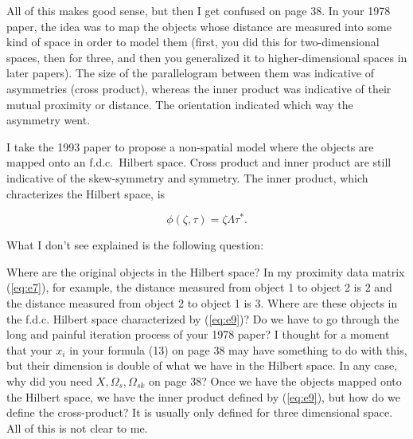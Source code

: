 \documentclass[landscape,10pt]{article}
\begin{document}
All of this makes good sense, but then I get confused on page 38. In
your 1978 paper, the idea was to map the objects whose distance are
measured into some kind of space in order to model them (first, you
did this for two-dimensional spaces, then for three, and then you
generalized it to higher-dimensional spaces in later papers). The size
of the parallelogram between them was indicative of asymmetries (cross
product), whereas the inner product was indicative of their mutual
proximity or distance. The orientation indicated which way the
asymmetry went.

I take the 1993 paper to propose a non-spatial model where the objects
are mapped onto an f.d.c.\ Hilbert space. Cross product and inner
product are still indicative of the skew-symmetry and symmetry. The
inner product, which chracterizes the Hilbert space, is

\begin{equation}
  \label{eq:e9}
  \phi(\zeta,\tau)=\zeta\Lambda\tau^{*}.
\end{equation}

What I don't see explained is the following question:

Where are the original objects in the Hilbert space? In my proximity
data matrix (\ref{eq:e7}), for example, the distance measured from
object 1 to object 2 is $2$ and the distance measured from object 2 to
object 1 is $3$. Where are these objects in the f.d.c. Hilbert space
characterized by (\ref{eq:e9})? Do we have to go through the long and
painful iteration process of your 1978 paper? I thought for a moment
that your $x_{i}$ in your formula (13) on page 38 may have something
to do with this, but their dimension is double of what we have in the
Hilbert space. In any case, why did you need
$X,\Omega_{s},\Omega_{sk}$ on page 38? Once we have the objects mapped
onto the Hilbert space, we have the inner product defined by
(\ref{eq:e9}), but how do we define the cross-product? It is usually
only defined for three dimensional space. All of this is not clear to
me.
\end{document}
